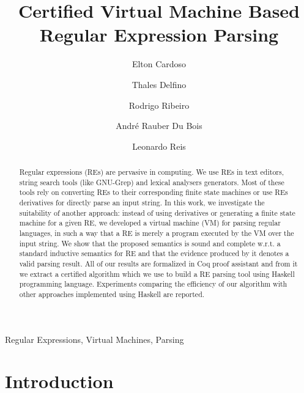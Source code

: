 \documentclass[review]{elsarticle}
\theoremstyle{definition}
\begin{document}
\begin{frontmatter}

\title{Certified Virtual Machine Based Regular Expression Parsing}

\author{Elton Cardoso}
\address{Departamento de Computa\c{c}\~ao e Sistemas - DECSI, Universidade Federal de Ouro Preto}
\author{Thales Delfino}
\author{Rodrigo Ribeiro}
\address{Programa de P\'os-Gradua\c{c}\~ao em Ci\^encia da Computa\c{c}\~ao -
  PPGCC, Universidade Federal de Ouro Preto}
\author{Andr\'e Rauber Du Bois}
\address{Programa de P\'os-Gradua\c{c}\~ao em Computa\c{c}\~ao -
  PPGC, Universidade Federal de Pelotas}
\author{Leonardo Reis}
\address{Departamento de Computa\c{c}\~ao, Universidade Federal de Juiz de Fora}


\begin{abstract}
Regular expressions (REs) are pervasive in computing. We use REs in text editors, string search tools
(like GNU-Grep) and lexical analysers generators. Most of these tools rely on
converting REs to their corresponding finite state machines or use REs derivatives for directly parse an
input string. In this work, we investigate the suitability of another approach: instead of
using derivatives or generating a finite state machine for a given RE, we developed a virtual machine
(VM) for parsing regular languages, in such a way that a RE is merely a program executed by the VM
over the input string. We show that the proposed semantics is sound and complete w.r.t. a standard
inductive semantics for RE and that the evidence produced by it denotes a valid parsing result.
All of our results are formalized in Coq proof assistant and from it we extract a certified algorithm
which we use to build a RE parsing tool using Haskell programming language. Experiments comparing the
efficiency of our algorithm with other approaches implemented using Haskell are reported.
\end{abstract}

\begin{keyword}
Regular Expressions, Virtual Machines, Parsing
\end{keyword}

\end{frontmatter}

\linenumbers

%

\section{Introduction}\label{sec:intro}
\end{document}
